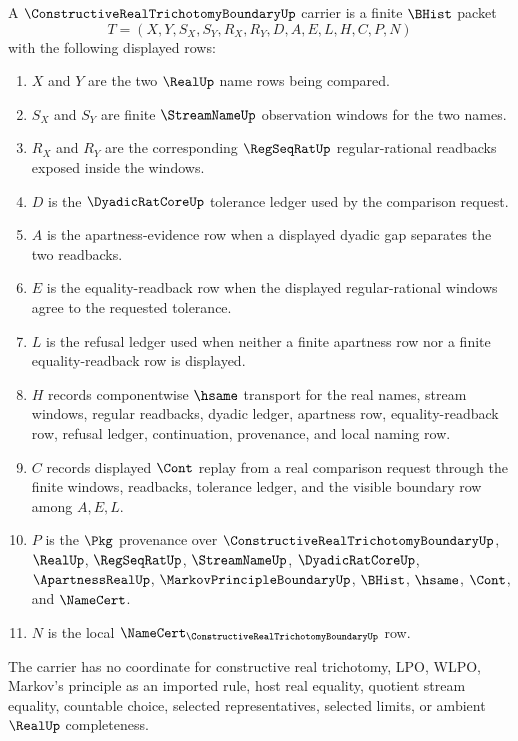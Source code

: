 \begin{definition}
\label{def:constructive-real-trichotomy-boundary-carrier}
A $\ConstructiveRealTrichotomyBoundaryUp$ carrier is a finite $\BHist$ packet
$$
T=(X,Y,S_X,S_Y,R_X,R_Y,D,A,E,L,H,C,P,N)
$$
with the following displayed rows:
\begin{enumerate}
\item $X$ and $Y$ are the two $\RealUp$ name rows being compared.
\item $S_X$ and $S_Y$ are finite $\StreamNameUp$ observation windows for the two names.
\item $R_X$ and $R_Y$ are the corresponding $\RegSeqRatUp$ regular-rational readbacks exposed inside the windows.
\item $D$ is the $\DyadicRatCoreUp$ tolerance ledger used by the comparison request.
\item $A$ is the apartness-evidence row when a displayed dyadic gap separates the two readbacks.
\item $E$ is the equality-readback row when the displayed regular-rational windows agree to the requested tolerance.
\item $L$ is the refusal ledger used when neither a finite apartness row nor a finite equality-readback row is displayed.
\item $H$ records componentwise $\hsame$ transport for the real names, stream windows, regular readbacks, dyadic ledger, apartness row, equality-readback row, refusal ledger, continuation, provenance, and local naming row.
\item $C$ records displayed $\Cont$ replay from a real comparison request through the finite windows, readbacks, tolerance ledger, and the visible boundary row among $A,E,L$.
\item $P$ is the $\Pkg$ provenance over $\ConstructiveRealTrichotomyBoundaryUp$, $\RealUp$, $\RegSeqRatUp$, $\StreamNameUp$, $\DyadicRatCoreUp$, $\ApartnessRealUp$, $\MarkovPrincipleBoundaryUp$, $\BHist$, $\hsame$, $\Cont$, and $\NameCert$.
\item $N$ is the local $\NameCert_{\ConstructiveRealTrichotomyBoundaryUp}$ row.
\end{enumerate}
The carrier has no coordinate for constructive real trichotomy, LPO, WLPO, Markov's principle as an imported rule, host real equality, quotient stream equality, countable choice, selected representatives, selected limits, or ambient $\RealUp$ completeness.
\end{definition}

